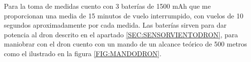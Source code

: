 
Para la toma de medidas cuento con 3 baterías de 1500 mAh que me proporcionan una media de 15 minutos de vuelo interrumpido, con vuelos de 10 segundos aproximadamente por cada medida.
Las baterías sirven para dar potencia al dron descrito en el apartado \ref{SEC:SENSORVIENTODRON}, para maniobrar con el dron cuento con un mando de un alcance teórico de 500 metros como el ilustrado en la figura \ref{FIG:MANDODRON}.

